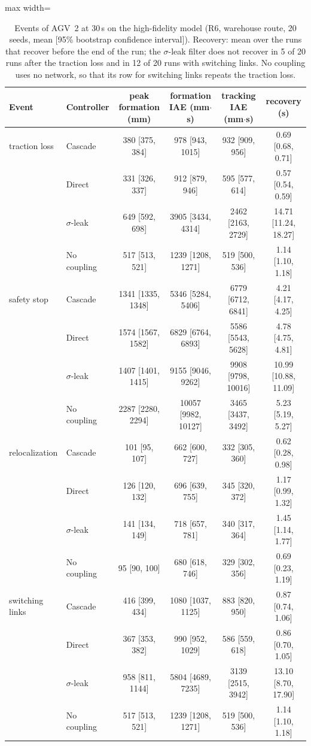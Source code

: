 \begin{table}[!t]\centering\footnotesize
\caption{Events of AGV~2 at 30\,s on the high-fidelity model (R6, warehouse route, 20 seeds, mean [95\% bootstrap confidence interval]). Recovery: mean over the runs that recover before the end of the run; the $\sigma$-leak filter does not recover in 5 of 20 runs after the traction loss and in 12 of 20 runs with switching links. No coupling uses no network, so that its row for switching links repeats the traction loss.}\label{tab:r6}
\begin{adjustbox}{max width=\textwidth}
\begin{tabular}{@{}llcccc@{}}\toprule
Event & Controller & peak formation (mm) & formation IAE (mm$\cdot$s) & tracking IAE (mm$\cdot$s) & recovery (s)\\\midrule
traction loss & Cascade & 380 [375, 384] & 978 [943, 1015] & 932 [909, 956] & 0.69 [0.68, 0.71]\\
 & Direct & 331 [326, 337] & 912 [879, 946] & 595 [577, 614] & 0.57 [0.54, 0.59]\\
 & $\sigma$-leak & 649 [592, 698] & 3905 [3434, 4314] & 2462 [2163, 2729] & 14.71 [11.24, 18.27]\\
 & No coupling & 517 [513, 521] & 1239 [1208, 1271] & 519 [500, 536] & 1.14 [1.10, 1.18]\\
\addlinespace
safety stop & Cascade & 1341 [1335, 1348] & 5346 [5284, 5406] & 6779 [6712, 6841] & 4.21 [4.17, 4.25]\\
 & Direct & 1574 [1567, 1582] & 6829 [6764, 6893] & 5586 [5543, 5628] & 4.78 [4.75, 4.81]\\
 & $\sigma$-leak & 1407 [1401, 1415] & 9155 [9046, 9262] & 9908 [9798, 10016] & 10.99 [10.88, 11.09]\\
 & No coupling & 2287 [2280, 2294] & 10057 [9982, 10127] & 3465 [3437, 3492] & 5.23 [5.19, 5.27]\\
\addlinespace
relocalization & Cascade & 101 [95, 107] & 662 [600, 727] & 332 [305, 360] & 0.62 [0.28, 0.98]\\
 & Direct & 126 [120, 132] & 696 [639, 755] & 345 [320, 372] & 1.17 [0.99, 1.32]\\
 & $\sigma$-leak & 141 [134, 149] & 718 [657, 781] & 340 [317, 364] & 1.45 [1.14, 1.77]\\
 & No coupling & 95 [90, 100] & 680 [618, 746] & 329 [302, 356] & 0.69 [0.23, 1.19]\\
\addlinespace
switching links & Cascade & 416 [399, 434] & 1080 [1037, 1125] & 883 [820, 950] & 0.87 [0.74, 1.06]\\
 & Direct & 367 [353, 382] & 990 [952, 1029] & 586 [559, 618] & 0.86 [0.70, 1.05]\\
 & $\sigma$-leak & 958 [811, 1144] & 5804 [4689, 7235] & 3139 [2515, 3942] & 13.10 [8.70, 17.90]\\
 & No coupling & 517 [513, 521] & 1239 [1208, 1271] & 519 [500, 536] & 1.14 [1.10, 1.18]\\
\bottomrule\end{tabular}
\end{adjustbox}
\end{table}
